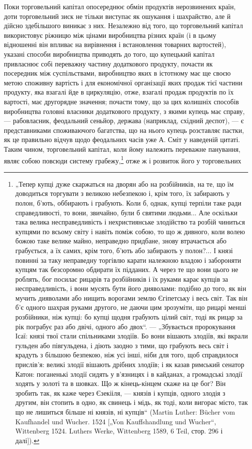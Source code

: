 Поки торговельний капітал опосереднює обмін продуктів
нерозвинених країн, доти торговельний зиск не тільки виступає
як ошукання і шахрайство, але й дійсно здебільшого виникає з них.
Незалежно від того, що торговельний капітал використовує ріжницю
між цінами виробництва різних країн (і в цьому відношенні
він впливає на вирівнення і встановлення товарних вартостей),
указані способи виробництва приводять до того, що
купецький капітал привласнює собі переважну частину додаткового
продукту, почасти як посередник між суспільствами, виробництво
яких в істотному має ще своєю метою споживну вартість
і для економічної організації яких продаж тієї частини продукту,
яка взагалі йде в циркуляцію, отже, взагалі продаж продуктів по
їх вартості, має другорядне значення; почасти тому, що за цих
колишніх способів виробництва головні власники додаткового
продукту, з якими купець має справу, — рабовласник, феодальний
сеньйор, держава (наприклад, східний деспот), — є представниками
споживаючого багатства, що на нього купець розставляє
пастки, як це правильно відчув щодо феодальних часів
уже А. Сміт у наведеній цитаті. Таким чином, торговельний капітал,
коли йому належить переважне панування, являє собою повсюди
систему грабежу,\footnote{
„Тепер купці дуже скаржаться на дворян або на розбійників, на те, що
їм доводиться торгувати з великою небезпекою і, крім того, їх забирають у полон,
б’ють, оббирають і грабують. Коли б, однак, купці терпіли таке ради
справедливості, то вони, звичайно, були б святими людьми... Але оскільки така
велика несправедливість і нехристиянське злодійство та розбій чиниться купцями
по всьому світу і навіть поміж собою, то що ж дивного, коли волею
божою таке велике майно, неправедно придбане, знову втрачається або
грабується, а їх самих, крім того, б’ють або забирають у полон?... І князі
повинні за таку неправедну торгівлю карати належною владою і забороняти
купцям так безсоромно обдирати їх підданих. А через те що вони цього не
роблять, бог посилає рицарів та розбійників і їх руками карає купців за несправедливість,
і вони мусять бути його дияволами: подібно до того, як він мучить
дияволами або нищить ворогами землю Єгіпетську і весь світ. Так він б’є
одного шахрая руками другого, не даючи цим зрозуміти, що рицарі менші
розбійники, ніж купці: бо купці щодня грабують цілий світ, тоді як рицар за рік
пограбує раз або двічі, одного або двох“. — „Збувається пророкування Ісаї:
князі твої стали спільниками злодіїв. Бо вони вішають злодіїв, які вкрали гульден
або півгульдена, і діють заодно з тими, що грабують весь світ і крадуть
з більшою безпекою, ніж усі інші, ніби для того, щоб справдилося прислів’я:
великі злодії вішають дрібних злодіїв; і як казав римський сенатор Катон: поганенькі
злодії сидять у в’язницях і в кайданах, а громадські злодії ходять
у золоті та в шовках. Що ж кінець-кінцем скаже на це бог? Він зробить так,
як каже через Єзекііля, — князів і купців, одного злодія з другим, він стопить
в одно, як свинець і мідь, як тоді, коли вигорає місто, так що не лишиться більше
ні князів, ні купців“ (Martin Luther: Bücher vom Kaufhandel und Wucher. 1524
[„Von Kauffshandlung und Wucher“, Wittenberg 1524. Luthers Werke, Wittenberg
1589, 6 Teil, стор. 296 і далі]).
} отже ж і розвиток його у торговельних
